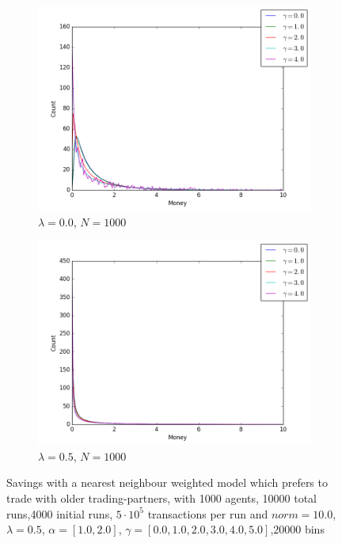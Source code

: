 \documentclass[a4paper,11pt]{article}
\begin{document}
{\begin{figure}[H]
	\centering
	\begin{subfigure}[t]{0.45\textwidth}
		\includegraphics[scale=0.4]{historic_lambda=0_5_alpha=1}
		\caption{$\lambda = 0.0$, $N=1000$}
		\label{fig:historic_lambda=0_5_alpha=1}
	\end{subfigure}
	\begin{subfigure}[t]{0.45\textwidth}
		\includegraphics[scale=0.4]{historic_lambda=0_5_alpha=2}
		\caption{$\lambda = 0.5$, $N=1000$}
		\label{fig:historic_lambda=0_5_alpha=2}
	\end{subfigure}
	\caption{Savings with a nearest neighbour weighted model which prefers to trade with older trading-partners, with 1000 agents, 10000 total runs,4000 initial runs,  $5\cdot 10^{5}$ transactions per run and  $norm=10.0$,$\lambda=0.5$, $\alpha=[1.0,2.0]$, $\gamma=[0.0,1.0,2.0,3.0,4.0,5.0]$,20000 bins}
	\label{fig:history_lambda=0_5}
\end{figure}


}
\end{document}

